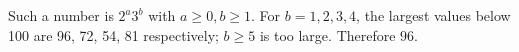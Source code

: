 Such a number is $2^a3^b$ with $a\ge0,b\ge1$. For $b=1,2,3,4$, the largest values below 100 are 96, 72, 54, 81 respectively; $b\ge5$ is too large. Therefore $\boxed{96}$.
